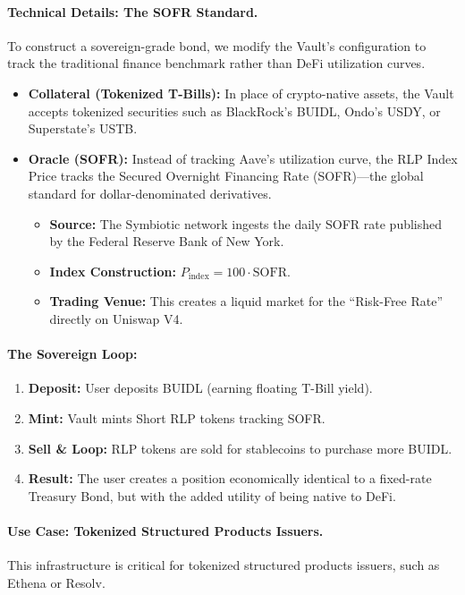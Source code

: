 \documentclass[12pt]{article}
\begin{document}
\paragraph{Technical Details: The SOFR Standard.}
To construct a sovereign-grade bond, we modify the Vault's configuration to track the traditional finance benchmark rather than DeFi utilization curves.

\begin{itemize}
    \item \textbf{Collateral (Tokenized T-Bills):} In place of crypto-native assets, the Vault accepts tokenized securities such as BlackRock's BUIDL, Ondo's USDY, or Superstate's USTB.
    \item \textbf{Oracle (SOFR):} Instead of tracking Aave's utilization curve, the RLP Index Price tracks the Secured Overnight Financing Rate (SOFR)---the global standard for dollar-denominated derivatives.
    \begin{itemize}
        \item \textbf{Source:} The Symbiotic network ingests the daily SOFR rate published by the Federal Reserve Bank of New York.
        \item \textbf{Index Construction:} $P_{\text{index}} = 100 \cdot \text{SOFR}$.
        \item \textbf{Trading Venue:} This creates a liquid market for the ``Risk-Free Rate'' directly on Uniswap V4.
    \end{itemize}
\end{itemize}

\paragraph{The Sovereign Loop:}
\begin{enumerate}
    \item \textbf{Deposit:} User deposits BUIDL (earning floating T-Bill yield).
    \item \textbf{Mint:} Vault mints Short RLP tokens tracking SOFR.
    \item \textbf{Sell \& Loop:} RLP tokens are sold for stablecoins to purchase more BUIDL.
    \item \textbf{Result:} The user creates a position economically identical to a fixed-rate Treasury Bond, but with the added utility of being native to DeFi.
\end{enumerate}

\paragraph{Use Case: Tokenized Structured Products Issuers.}
This infrastructure is critical for tokenized structured products issuers, such as Ethena or Resolv.
\end{document}
